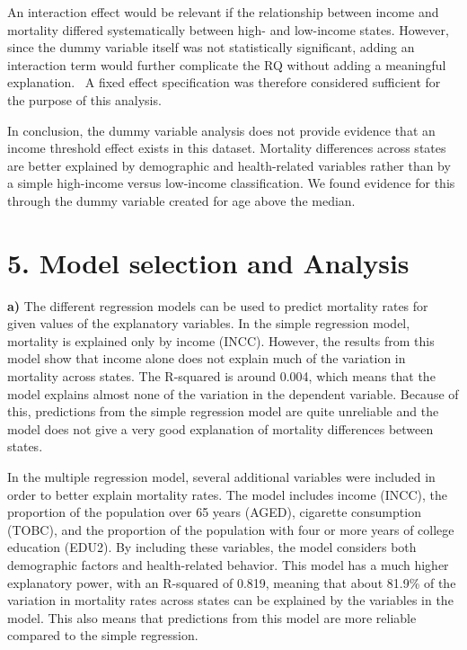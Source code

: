 \documentclass[
  letterpaper,
  DIV=11,
  numbers=noendperiod]{scrartcl}
\begin{document}
An interaction effect would be relevant if the relationship between
income and mortality differed systematically between high- and
low-income states. However, since the dummy variable itself was not
statistically significant, adding an interaction term would further
complicate the RQ without adding a meaningful explanation. ~A fixed
effect specification was therefore considered sufficient for the purpose
of this analysis.

In conclusion, the dummy variable analysis does not provide evidence
that an income threshold effect exists in this dataset. Mortality
differences across states are better explained by demographic and
health-related variables rather than by a simple high-income versus
low-income classification. We found evidence for this through the dummy
variable created for age above the median. \newpage{}

\section{5. Model selection and
Analysis}\label{model-selection-and-analysis}

\textbf{a)} The different regression models can be used to predict
mortality rates for given values of the explanatory variables. In the
simple regression model, mortality is explained only by income (INCC).
However, the results from this model show that income alone does not
explain much of the variation in mortality across states. The R-squared
is around 0.004, which means that the model explains almost none of the
variation in the dependent variable. Because of this, predictions from
the simple regression model are quite unreliable and the model does not
give a very good explanation of mortality differences between states.

In the multiple regression model, several additional variables were
included in order to better explain mortality rates. The model includes
income (INCC), the proportion of the population over 65 years (AGED),
cigarette consumption (TOBC), and the proportion of the population with
four or more years of college education (EDU2). By including these
variables, the model considers both demographic factors and
health-related behavior. This model has a much higher explanatory power,
with an R-squared of 0.819, meaning that about 81.9\% of the variation
in mortality rates across states can be explained by the variables in
the model. This also means that predictions from this model are more
reliable compared to the simple regression.
\end{document}
